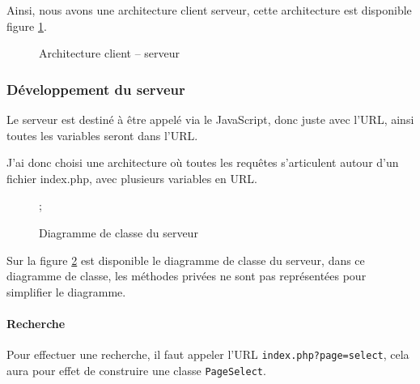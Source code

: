     Ainsi, nous avons une architecture client serveur, cette architecture est disponible figure \ref{fig:archiClientServeur}.
    \begin{figure}[H]
        \centering
        
        \caption{Architecture client -- serveur}
        \label{fig:archiClientServeur}
    \end{figure}
        \subsubsection{Développement du serveur}
            Le serveur est destiné à être appelé via le JavaScript, donc juste avec l'URL, ainsi toutes les variables seront dans l'URL.

        J'ai donc choisi une architecture où toutes les requêtes s'articulent autour d'un fichier index.php, avec plusieurs variables en URL.
        \begin{figure}[H]
            \hspace{-35px};
            
            \caption{Diagramme de classe du serveur}
            \label{fig:diagClasseServer}
        \end{figure}


        Sur la figure \ref{fig:diagClasseServer} est disponible le diagramme de classe du serveur, dans ce diagramme de classe, les méthodes privées ne sont pas représentées pour simplifier le diagramme.

        \paragraph{Recherche}
            Pour effectuer une recherche, il faut appeler l'URL \texttt{index.php?page=select}, cela aura pour effet de construire une classe \texttt{PageSelect}.

